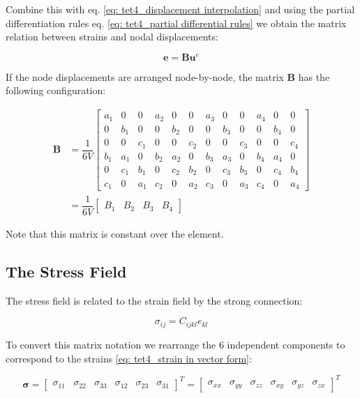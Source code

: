 Combine this with eq. \ref{eq: tet4_displacement interpolation} and using the partial differentiation rules eq. \ref{eq: tet4_partial differential rules} we obtain the matrix relation between strains and nodal displacements:

\begin{equation}
\mathbf{e} = \mathbf{B} \mathbf{u}^e
\end{equation}

If the node displacements are arranged node-by-node, the matrix $ \mathbf{B} $ has the following configuration:

\setcounter{MaxMatrixCols}{20}
\begin{equation} \label{eq: tet4_matrix B}
\begin{split}
\mathbf{B} &= \dfrac{1}{6V} \begin{bmatrix}
a_1 & 0 & 0 & a_2 & 0 & 0 & a_3 & 0 & 0 & a_4 & 0 & 0\\
0 & b_1 & 0 & 0 & b_2 & 0 & 0 & b_3 & 0 & 0 & b_4 & 0\\
0 & 0 & c_1 & 0 & 0 & c_2 & 0 & 0 & c_3 & 0 & 0 & c_4\\
b_1 & a_1 & 0 & b_2 & a_2 & 0 & b_3 & a_3 & 0 & b_4 & a_4 & 0\\
0 & c_1 & b_1 & 0 & c_2 & b_2 & 0 & c_3 & b_3 & 0 & c_4 & b_4\\
c_1 & 0 & a_1 & c_2 & 0 & a_2 & c_3 & 0 & a_3 & c_4 & 0 & a_4
\end{bmatrix}\\
&= \dfrac{1}{6V}\begin{bmatrix}
B_1 & B_2 & B_3 & B_4
\end{bmatrix}
\end{split}
\end{equation}

Note that this matrix is constant over the element.

\subsection{The Stress Field}
The stress field is related to the strain field by the strong connection:

\begin{equation}
\sigma_{ij} = C_{ijkl} e_{kl}
\end{equation}

To convert this matrix notation we rearrange the 6 independent components to correspond to the strains \ref{eq: tet4_strain in vector form}:

\begin{equation} \label{eq: tet4_stress in vector form}
\mathbf{\sigma} = \begin{bmatrix}
\sigma_{11} & \sigma_{22} & \sigma_{33} & \sigma_{12} & \sigma_23 & \sigma_{31}
\end{bmatrix}^T = \begin{bmatrix}
\sigma_{xx} & \sigma_{yy} & \sigma_{zz} & \sigma_{xy} & \sigma_{yz} & \sigma_{zx}
\end{bmatrix}^T
\end{equation}

